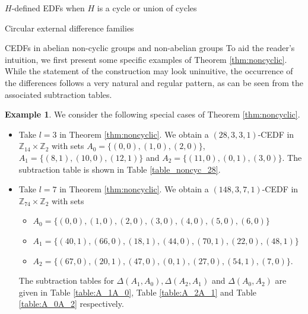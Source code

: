 \documentclass[12pt, a4paper]{article}
\theoremstyle{definition}
\newtheorem{example}[theorem]{Example}
\begin{document}
\begin{section}{$H$-defined EDFs when $H$ is a cycle or union of cycles}
\begin{subsection}{Circular external difference families}
\begin{subsection}{CEDFs in abelian non-cyclic groups and non-abelian groups}
To aid the reader's intuition, we first present some specific examples of Theorem \ref{thm:noncyclic}. While the statement of the construction may look uninuitive, the occurrence of the differences follows a very natural and regular pattern, as can be seen from the associated subtraction tables.

\begin{example}
We consider the following special cases of Theorem \ref{thm:noncyclic}.
\begin{itemize}
\item[(i)] Take $l=3$ in Theorem \ref{thm:noncyclic}.  We obtain a $(28,3,3,1)$-CEDF in $\mathbb{Z}_{14} \times \mathbb{Z}_2$ with sets $A_0=\{(0,0), (1,0), (2,0)\}$, $A_1=\{(8,1), (10,0), (12,1)\}$ and $A_2=\{(11,0), (0,1), (3,0)\}$.  The subtraction table is shown in Table \ref{table_noncyc_28}.
\item[(ii)] Take $l=7$ in Theorem \ref{thm:noncyclic}.  We obtain a $(148,3,7,1)$-CEDF in $\mathbb{Z}_{74} \times \mathbb{Z}_2$ with sets 
\begin{itemize}
\item $A_0=\{(0,0), (1,0), (2,0), (3,0),  (4,0), (5,0), (6,0)\}$
\item $A_1=\{(40,1),(66,0),	(18,1), (44,0), (70,1), (22,0), (48,1)\}$ 
\item $A_2=\{(67,0), (20,1), (47,0), (0,1), (27,0), (54,1),	(7,0) \}$.
\end{itemize}
The subtraction tables for $\Delta(A_1,A_0), \Delta(A_2,A_1)$ and $\Delta(A_0,A_2)$ are given in Table \ref{table:A_1A_0}, Table \ref{table:A_2A_1} and Table \ref{table:A_0A_2} respectively. 
\end{itemize}


\end{example}
\end{subsection}
\end{subsection}
\end{section}
\end{document}
